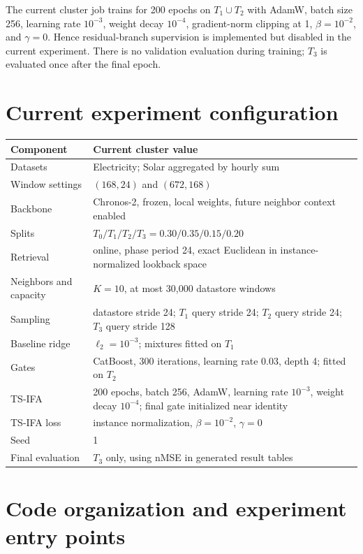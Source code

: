 \documentclass[11pt]{article}
\begin{document}
The current cluster job trains for 200 epochs on $T_1\cup T_2$ with AdamW,
batch size 256, learning rate $10^{-3}$, weight decay $10^{-4}$, gradient-norm
clipping at 1, $\beta=10^{-2}$, and $\gamma=0$.  Hence residual-branch
supervision is implemented but disabled in the current experiment.  There is
no validation evaluation during training; $T_3$ is evaluated once after the
final epoch.

\section{Current experiment configuration}

\begin{center}
\begin{tabularx}{\textwidth}{@{}l X@{}}
\toprule
Component & Current cluster value \\
\midrule
Datasets & Electricity; Solar aggregated by hourly sum \\
Window settings & $(168,24)$ and $(672,168)$ \\
Backbone & Chronos-2, frozen, local weights, future neighbor context enabled \\
Splits & $T_0/T_1/T_2/T_3=0.30/0.35/0.15/0.20$ \\
Retrieval & online, phase period 24, exact Euclidean in instance-normalized lookback space \\
Neighbors and capacity & $K=10$, at most 30,000 datastore windows \\
Sampling & datastore stride 24; $T_1$ query stride 24; $T_2$ query stride 24; $T_3$ query stride 128 \\
Baseline ridge & $\ell_2=10^{-3}$; mixtures fitted on $T_1$ \\
Gates & CatBoost, 300 iterations, learning rate 0.03, depth 4; fitted on $T_2$ \\
TS-IFA & 200 epochs, batch 256, AdamW, learning rate $10^{-3}$, weight decay $10^{-4}$; final gate initialized near identity \\
TS-IFA loss & instance normalization, $\beta=10^{-2}$, $\gamma=0$ \\
Seed & 1 \\
Final evaluation & $T_3$ only, using nMSE in generated result tables \\
\bottomrule
\end{tabularx}
\end{center}

\section{Code organization and experiment entry points}
\end{document}
